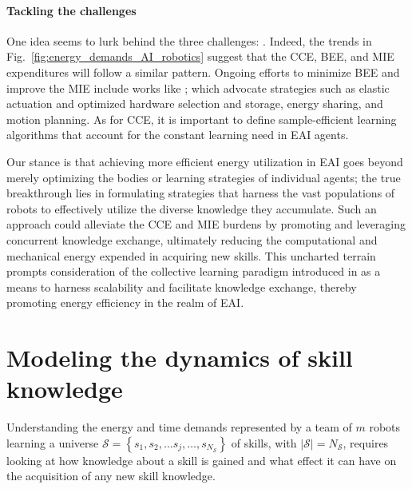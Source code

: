 \documentclass[12pt]{article}
\begin{document}
\paragraph*{\textbf{Tackling the challenges}}
One idea seems to lurk behind the three challenges: . Indeed, the trends in Fig.~\ref{fig:energy_demands_AI_robotics} suggest that the CCE, BEE, and MIE expenditures will follow a similar pattern. Ongoing efforts to minimize BEE and improve the MIE include works like \cite{schroder2014, chalmers2015, mohammed2014, chemnitz2011}; which advocate strategies such as elastic actuation and optimized hardware selection and storage, energy sharing, and motion planning. As for CCE, it is important to define sample-efficient learning algorithms that account for the constant learning need in EAI agents. 

Our stance is that achieving more efficient energy utilization in EAI goes beyond merely optimizing the bodies or learning strategies of individual agents; the true breakthrough lies in formulating strategies that harness the vast populations of robots to effectively utilize the diverse knowledge they accumulate. Such an approach could alleviate the CCE and MIE burdens by promoting and leveraging concurrent knowledge exchange, ultimately reducing the computational and mechanical energy expended in acquiring new skills. This uncharted terrain prompts consideration of the collective learning paradigm introduced in \cite{Haddadin2014SystemzumErstellen,Haddadin2015Systemgeneratingsets} as a means to harness scalability and facilitate knowledge exchange, thereby promoting energy efficiency in the realm of EAI.

\section*{Modeling the dynamics of skill knowledge}\label{sec:knowledge_dynamics_model}
Understanding the energy and time demands represented by a team of $m$ robots learning a universe $\mathcal{S}=\left\lbrace s_1,s_2,\ldots s_j,\ldots, s_{N_\mathcal{S}}\right\rbrace$ of skills, with $|\mathcal{S}| = N_\mathcal{S}$, requires looking at how knowledge about a skill is gained and what effect it can have on the acquisition of any new skill knowledge. 
\end{document}
